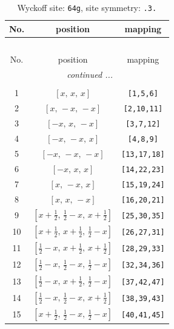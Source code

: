\documentclass[fleqn,8pt]{jsarticle}
\begin{document}
\begin{longtable}{ccc}
\caption{Wyckoff site: {\tt 64g}, site symmetry: {\tt .3.}}
 \\
 \hline \hline
No. & position & mapping \\ \hline \endfirsthead

\multicolumn{2}{l}{\tablename\ \thetable{}} \\
 \hline \hline
No. & position & mapping \\ \hline \endhead

 \hline \hline
\multicolumn{2}{r}{\footnotesize\it continued ...} \\ \endfoot

 \hline \hline
\multicolumn{2}{r}{} \\ \endlastfoot

1 & $\left[ x,\, x,\, x \right]$ & {\tt [1,5,6]} \\ \hline
2 & $\left[ x,\, - x,\, - x \right]$ & {\tt [2,10,11]} \\ \hline
3 & $\left[ - x,\, x,\, - x \right]$ & {\tt [3,7,12]} \\ \hline
4 & $\left[ - x,\, - x,\, x \right]$ & {\tt [4,8,9]} \\ \hline
5 & $\left[ - x,\, - x,\, - x \right]$ & {\tt [13,17,18]} \\ \hline
6 & $\left[ - x,\, x,\, x \right]$ & {\tt [14,22,23]} \\ \hline
7 & $\left[ x,\, - x,\, x \right]$ & {\tt [15,19,24]} \\ \hline
8 & $\left[ x,\, x,\, - x \right]$ & {\tt [16,20,21]} \\ \hline
9 & $\left[ x + \frac{1}{2},\, \frac{1}{2} - x,\, x + \frac{1}{2} \right]$ & {\tt [25,30,35]} \\ \hline
10 & $\left[ x + \frac{1}{2},\, x + \frac{1}{2},\, \frac{1}{2} - x \right]$ & {\tt [26,27,31]} \\ \hline
11 & $\left[ \frac{1}{2} - x,\, x + \frac{1}{2},\, x + \frac{1}{2} \right]$ & {\tt [28,29,33]} \\ \hline
12 & $\left[ \frac{1}{2} - x,\, \frac{1}{2} - x,\, \frac{1}{2} - x \right]$ & {\tt [32,34,36]} \\ \hline
13 & $\left[ \frac{1}{2} - x,\, x + \frac{1}{2},\, \frac{1}{2} - x \right]$ & {\tt [37,42,47]} \\ \hline
14 & $\left[ \frac{1}{2} - x,\, \frac{1}{2} - x,\, x + \frac{1}{2} \right]$ & {\tt [38,39,43]} \\ \hline
15 & $\left[ x + \frac{1}{2},\, \frac{1}{2} - x,\, \frac{1}{2} - x \right]$ & {\tt [40,41,45]} \\ \hline

\end{longtable}
\end{document}
